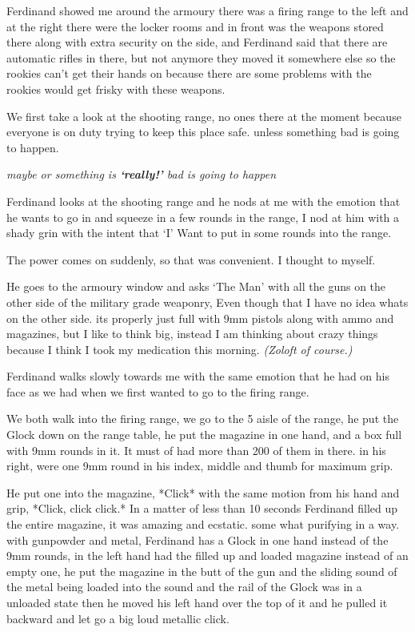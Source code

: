 \documentclass[14pt,letterpaper]{book}
\begin{document}
Ferdinand showed me around the armoury there was a firing range to the left and at the right there were the locker rooms and in front was the weapons stored there along with extra security on the side, and Ferdinand said that there are automatic rifles in there, but not anymore they moved it somewhere else so the rookies can't get their hands on because there are some problems with the rookies would get frisky with these weapons.

We first take a look at the shooting range, no ones there at the moment because everyone is on duty trying to keep this place safe. unless something bad is going to happen.

\textit{maybe or something is \textbf{`really!'} bad is going to happen}

Ferdinand looks at the shooting range and he nods at me with the emotion that he wants to go in and squeeze in a few rounds in the range, I nod at him with a shady grin with the intent that `I' Want to put in some rounds into the range.

The power comes on suddenly, so that was convenient. I thought to myself.

He goes to the armoury window and asks `The Man' with all the guns on the other side of the military grade weaponry, Even though that I have no idea whats on the other side. its properly just full with 9mm pistols along with ammo and magazines, but I like to think big, instead I am thinking about crazy things because I think I took my medication this morning. \small{\textit{(Zoloft of course.)}}

Ferdinand walks slowly towards me with the same emotion that he had on his face as we had when we first wanted to go to the firing range.

We both walk into the firing range, we go to the 5 aisle of the range, he put the Glock down on the range table, he put the magazine in one hand, and a box full with 9mm rounds in it. It must of had more than 200 of them in there. in his right, were one 9mm round in his index, middle and thumb for maximum grip.

He put one into the magazine, *Click* with the same motion from his hand and grip, *Click, click click.*
In a matter of less than 10 seconds Ferdinand filled up the entire magazine, it was amazing and ecstatic. some what purifying in a way. with gunpowder and metal, Ferdinand has a Glock in one hand instead of the 9mm rounds, in the left hand had the filled up and loaded magazine instead of an empty one, he put the magazine in the butt of the gun and the sliding sound of the metal being loaded into the sound and the rail of the Glock was in a unloaded state then he moved his left hand over the top of it and he pulled it backward and let go a big loud metallic click.
\end{document}
